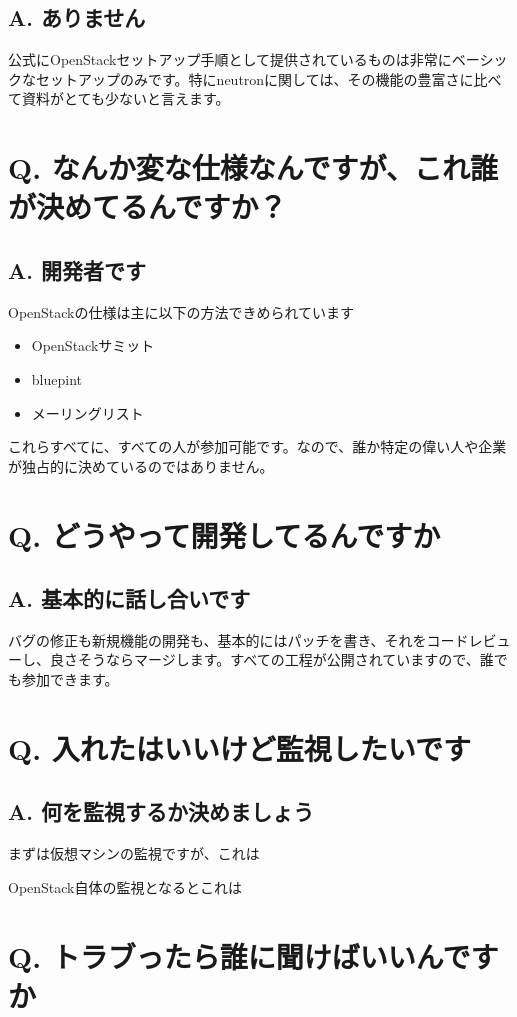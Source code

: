 \documentclass[9pt,b5paper,tombo,openany]{jsbook}
\begin{document}
\subsection*{A. ありません}
公式にOpenStackセットアップ手順として提供されているものは非常にベーシックなセットアップのみです。特にneutronに関しては、その機能の豊富さに比べて資料がとても少ないと言えます。

\section*{Q. なんか変な仕様なんですが、これ誰が決めてるんですか？}
\subsection*{A. 開発者です}
OpenStackの仕様は主に以下の方法できめられています
\begin{itemize}
	\item OpenStackサミット
	\item bluepint
	\item メーリングリスト
\end{itemize}
これらすべてに、すべての人が参加可能です。なので、誰か特定の偉い人や企業が独占的に決めているのではありません。

\section*{Q. どうやって開発してるんですか}
\subsection*{A. 基本的に話し合いです}
バグの修正も新規機能の開発も、基本的にはパッチを書き、それをコードレビューし、良さそうならマージします。すべての工程が公開されていますので、誰でも参加できます。

\section*{Q. 入れたはいいけど監視したいです}
\subsection*{A. 何を監視するか決めましょう}
まずは仮想マシンの監視ですが、これは

OpenStack自体の監視となるとこれは

\section*{Q. トラブったら誰に聞けばいいんですか}
\end{document}
